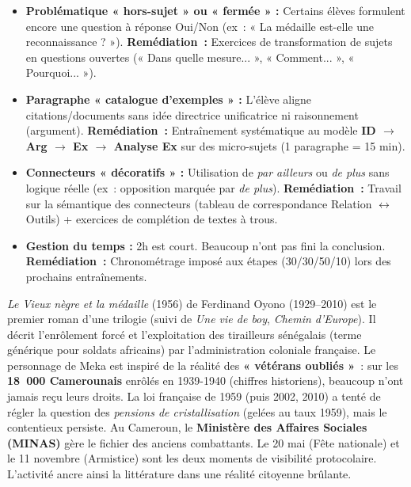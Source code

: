 \documentclass[11pt]{article}
\newcommand{\cle}[1]{{\popxbold\color{popdark}#1}}
\begin{document}
\begin{attention}
\begin{itemize}
    \item \textbf{Problématique « hors-sujet » ou « fermée » :} Certains élèves formulent encore une question à réponse Oui/Non (ex~: « La médaille est-elle une reconnaissance ? »). \textbf{Remédiation~:} Exercices de transformation de sujets en questions ouvertes (« Dans quelle mesure... », « Comment... », « Pourquoi... »).
    \item \textbf{Paragraphe « catalogue d'exemples » :} L'élève aligne citations/documents sans \cle{idée directrice} unificatrice ni \cle{raisonnement} (argument). \textbf{Remédiation~:} Entraînement systématique au modèle \textbf{ID $\to$ Arg $\to$ Ex $\to$ Analyse Ex} sur des micro-sujets (1 paragraphe = 15 min).
    \item \textbf{Connecteurs « décoratifs » :} Utilisation de \emph{par ailleurs} ou \emph{de plus} sans logique réelle (ex~: opposition marquée par \emph{de plus}). \textbf{Remédiation~:} Travail sur la \cle{sémantique des connecteurs} (tableau de correspondance Relation $\leftrightarrow$ Outils) + exercices de complétion de textes à trous.
    \item \textbf{Gestion du temps :} 2h est court. Beaucoup n'ont pas fini la conclusion. \textbf{Remédiation~:} Chronométrage imposé aux étapes (30/30/50/10) lors des prochains entraînements.
\end{itemize}
\end{attention}

\begin{savaistu}
\emph{Le Vieux nègre et la médaille} (1956) de Ferdinand Oyono (1929--2010) est le premier roman d'une trilogie (suivi de \emph{Une vie de boy}, \emph{Chemin d'Europe}). Il décrit l'enrôlement forcé et l'exploitation des \cle{tirailleurs sénégalais} (terme générique pour soldats africains) par l'administration coloniale française. Le personnage de Meka est inspiré de la réalité des \textbf{« vétérans oubliés »}~: sur les \textbf{18~000 Camerounais} enrôlés en 1939-1940 (chiffres historiens), beaucoup n'ont jamais reçu leurs droits. La loi française de 1959 (puis 2002, 2010) a tenté de régler la question des \emph{pensions de cristallisation} (gelées au taux 1959), mais le contentieux persiste. Au Cameroun, le \textbf{Ministère des Affaires Sociales (MINAS)} gère le fichier des anciens combattants. Le 20 mai (Fête nationale) et le 11 novembre (Armistice) sont les deux moments de visibilité protocolaire. L'activité ancre ainsi la littérature dans une \cle{réalité citoyenne} brûlante.
\end{savaistu}
\end{document}

